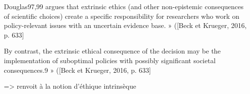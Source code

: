 \begin{displayquote}
    Douglas97,99 argues that extrinsic ethics (and other non-epistemic consequences of scientific choices) create a specific responsibility for researchers who work on policy-relevant issues with an uncertain evidence base. » ([Beck et Krueger, 2016, p. 633]
\end{displayquote}
\begin{displayquote}
     By contrast, the extrinsic ethical consequence of the decision may be the implementation of suboptimal policies with possibly significant societal consequences.9 » ([Beck et Krueger, 2016, p. 633]
\end{displayquote}

=> renvoit à la notion d'éthique intrinsèque



